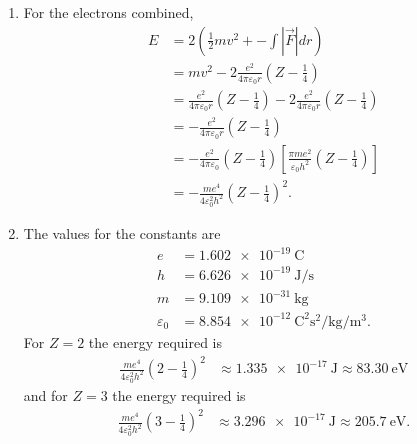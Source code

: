\documentclass[a4paper,12pt]{article}
\begin{document}
\begin{enumerate}
\begin{enumerate}
            \item
                For the electrons combined,
                \begin{align*}
                    E &= 2 \left( \frac{1}{2}mv^2 + -\int |\vec{F}| dr \right) \\
                    &= mv^2 - 2\frac{e^2}{4 \pi \varepsilon_0 r} \left( Z - \frac{1}{4} \right) \\
                    &= \frac{e^2}{4 \pi \varepsilon_0 r} \left( Z - \frac{1}{4} \right) - 2\frac{e^2}{4 \pi \varepsilon_0 r} \left( Z - \frac{1}{4} \right) \\
                    &= -\frac{e^2}{4 \pi \varepsilon_0 r} \left( Z - \frac{1}{4} \right) \\
                    &= -\frac{e^2}{4 \pi \varepsilon_0} \left( Z - \frac{1}{4} \right) \left[ \frac{\pi m e^2}{\varepsilon_0 h^2} \left( Z - \frac{1}{4} \right) \right] \\
                    &= -\frac{me^4}{4 \varepsilon_0^2 h^2} \left( Z - \frac{1}{4} \right)^2.
                \end{align*}

            \item
                The values for the constants are
                \begin{align*}
                    e &= \SI{1.602e-19}{\coulomb} \\
                    h &= \SI{6.626e-19}{\J\per\s} \\
                    m &= \SI{9.109e-31}{\kg} \\
                    \varepsilon_0 &= \SI{8.854e-12}{\coulomb\squared\s\squared\per\kilogram\per\m\cubed}.
                \end{align*}
                For $Z = 2$ the energy required is
                \begin{align*}
                    \frac{me^4}{4 \varepsilon_0^2 h^2} \left( 2 - \frac{1}{4} \right)^2 &\approx \SI{1.335e-17}{\J} \approx \SI{83.30}{\eV}
                \end{align*}
                and for $Z = 3$ the energy required is
                \begin{align*}
                    \frac{me^4}{4 \varepsilon_0^2 h^2} \left( 3 - \frac{1}{4} \right)^2 &\approx \SI{3.296e-17}{\J} \approx \SI{205.7}{\eV}.
                \end{align*}
        \end{enumerate}


\end{enumerate}
\end{document}
